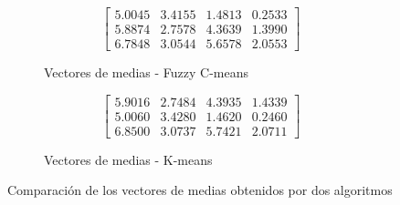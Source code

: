 \documentclass[11pt, letterpaper]{article}
\begin{document}
\begin{figure}[h!]
	\centering
	\begin{subfigure}[t]{0.45\textwidth}
		\centering
		\[
		\begin{bmatrix}
			5.0045 & 3.4155 & 1.4813 & 0.2533 \\
			5.8874 & 2.7578 & 4.3639 & 1.3990 \\
			6.7848 & 3.0544 & 5.6578 & 2.0553
		\end{bmatrix}
		\]
		\caption{Vectores de medias - Fuzzy C-means}
	\end{subfigure}
	\hspace{0.05\textwidth}
	\begin{subfigure}[t]{0.45\textwidth}
		\centering
		\[
		\begin{bmatrix}
			5.9016 & 2.7484 & 4.3935 & 1.4339 \\
			5.0060 & 3.4280 & 1.4620 & 0.2460 \\
			6.8500 & 3.0737 & 5.7421 & 2.0711
		\end{bmatrix}
		\]
		\caption{Vectores de medias - K-means}
	\end{subfigure}
	\caption{Comparación de los vectores de medias obtenidos por dos algoritmos}
\end{figure}

\newpage
\end{document}
